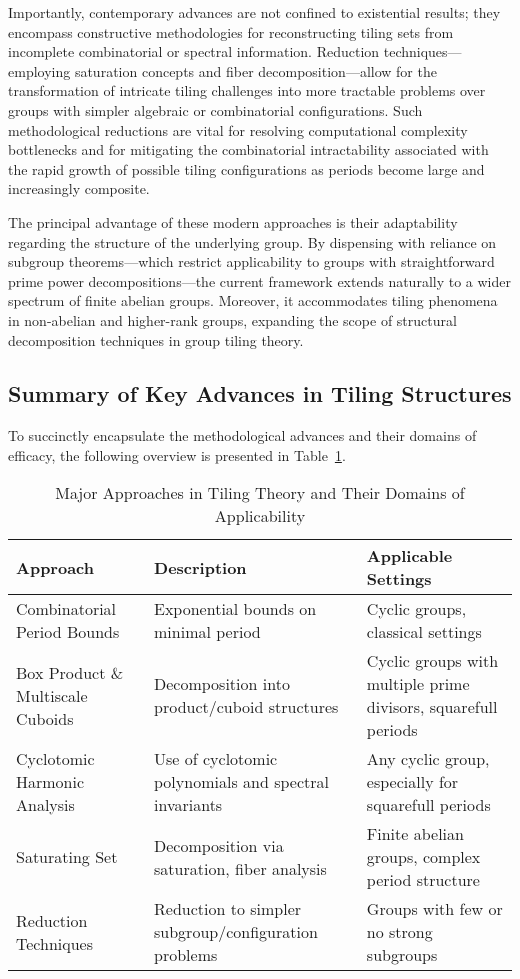 \documentclass[11pt]{article}
\begin{document}
Importantly, contemporary advances are not confined to existential results; they encompass constructive methodologies for reconstructing tiling sets from incomplete combinatorial or spectral information. Reduction techniques—employing saturation concepts and fiber decomposition—allow for the transformation of intricate tiling challenges into more tractable problems over groups with simpler algebraic or combinatorial configurations. Such methodological reductions are vital for resolving computational complexity bottlenecks and for mitigating the combinatorial intractability associated with the rapid growth of possible tiling configurations as periods become large and increasingly composite.

The principal advantage of these modern approaches is their adaptability regarding the structure of the underlying group. By dispensing with reliance on subgroup theorems—which restrict applicability to groups with straightforward prime power decompositions—the current framework extends naturally to a wider spectrum of finite abelian groups. Moreover, it accommodates tiling phenomena in non-abelian and higher-rank groups, expanding the scope of structural decomposition techniques in group tiling theory.

\subsection{Summary of Key Advances in Tiling Structures}

To succinctly encapsulate the methodological advances and their domains of efficacy, the following overview is presented in Table~\ref{tab:advances}.

\begin{table}[ht]
\centering
\caption{Major Approaches in Tiling Theory and Their Domains of Applicability}
\label{tab:advances}
\begin{tabular}{|l|l|l|}
\hline
\textbf{Approach} & \textbf{Description} & \textbf{Applicable Settings} \\ \hline
Combinatorial Period Bounds & Exponential bounds on minimal period & Cyclic groups, classical settings \\ \hline
Box Product \& Multiscale Cuboids & Decomposition into product/cuboid structures & Cyclic groups with multiple prime divisors, squarefull periods \\ \hline
Cyclotomic Harmonic Analysis & Use of cyclotomic polynomials and spectral invariants & Any cyclic group, especially for squarefull periods \\ \hline
Saturating Set & Decomposition via saturation, fiber analysis & Finite abelian groups, complex period structure \\ \hline
Reduction Techniques & Reduction to simpler subgroup/configuration problems & Groups with few or no strong subgroups \\ \hline
\end{tabular}
\end{table}
\end{document}
